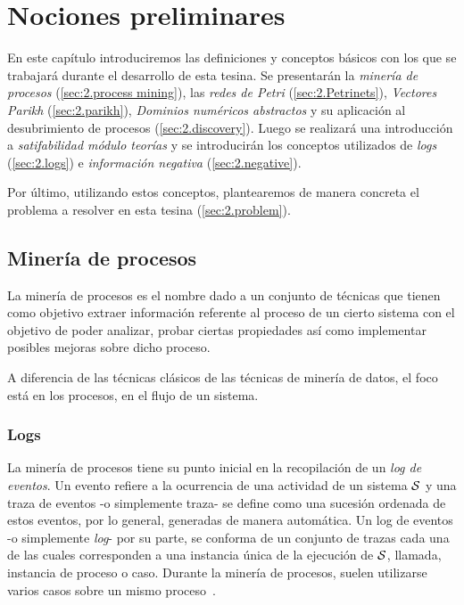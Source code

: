 \chapter[Nociones preliminares]{Nociones preliminares}
\label{chap:2}

En este capítulo introduciremos las definiciones y conceptos básicos con los que se trabajará durante el desarrollo de 
esta tesina. Se presentarán la \textit{minería de procesos} (\autoref{sec:2.process mining}), 
las \textit{redes de Petri} (\autoref{sec:2.Petrinets}), \textit{Vectores Parikh} (\autoref{sec:2.parikh}), 
\textit{Dominios numéricos abstractos} y su aplicación al desubrimiento de procesos (\autoref{sec:2.discovery}).
Luego se realizará una introducción a \textit{satifabilidad módulo teorías} 
y se introducirán los conceptos utilizados de \textit{logs} (\autoref{sec:2.logs}) 
e \textit{información negativa} (\autoref{sec:2.negative}).

Por último, utilizando estos conceptos, plantearemos de manera concreta el problema a resolver en 
esta tesina (\autoref{sec:2.problem}).

\section{Minería de procesos} 
\label{sec:2.process mining}

La minería de procesos es el nombre dado a un conjunto de técnicas que tienen
como objetivo extraer información referente al proceso de un cierto sistema
con el objetivo de poder analizar, probar ciertas propiedades 
así como implementar posibles mejoras sobre dicho proceso.

A diferencia de las técnicas clásicos de las técnicas de minería de datos, el foco
está en los procesos, en el flujo de un sistema.

\subsection{Logs} 
\label{sec:2.logs}

La minería de procesos tiene su punto inicial en la recopilación de un \textit{log de eventos}. 
Un evento refiere a la ocurrencia de una actividad de un sistema $\mathcal{S}$ y
una traza de eventos -o simplemente traza- se define como una sucesión
ordenada de estos eventos, por lo general, generadas de manera automática.
Un log de eventos -o simplemente \textit{log}- por su parte, se conforma de un
conjunto de trazas cada una de las cuales corresponden a una instancia única 
de la ejecución de $\mathcal{S}$, llamada, instancia de proceso o caso.
Durante la minería de procesos, suelen utilizarse varios casos sobre un mismo proceso~\cite{Aalst2004}.

